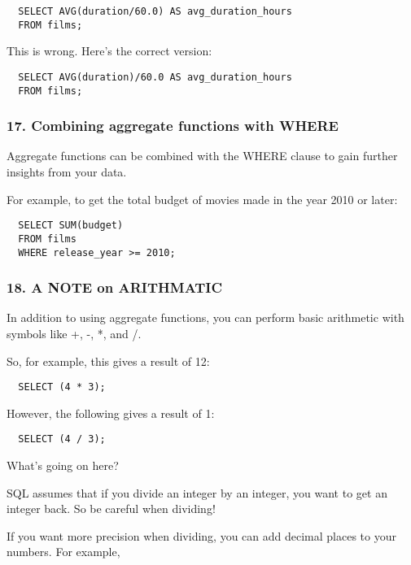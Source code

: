 \documentclass[
]{article}
\begin{document}
\begin{verbatim}
  SELECT AVG(duration/60.0) AS avg_duration_hours
  FROM films;
\end{verbatim}

This is wrong. Here's the correct version:

\begin{verbatim}
  SELECT AVG(duration)/60.0 AS avg_duration_hours
  FROM films;
\end{verbatim}

\hypertarget{combining-aggregate-functions-with-where}{%
\subsubsection{17. Combining aggregate functions with
WHERE}\label{combining-aggregate-functions-with-where}}

Aggregate functions can be combined with the WHERE clause to gain
further insights from your data.

For example, to get the total budget of movies made in the year 2010 or
later:

\begin{verbatim}
  SELECT SUM(budget)
  FROM films
  WHERE release_year >= 2010;
\end{verbatim}

\hypertarget{a-note-on-arithmatic}{%
\subsubsection{18. A NOTE on ARITHMATIC}\label{a-note-on-arithmatic}}

In addition to using aggregate functions, you can perform basic
arithmetic with symbols like +, -, *, and /.

So, for example, this gives a result of 12:

\begin{verbatim}
  SELECT (4 * 3);
\end{verbatim}

However, the following gives a result of 1:

\begin{verbatim}
  SELECT (4 / 3);
\end{verbatim}

What's going on here?

SQL assumes that if you divide an integer by an integer, you want to get
an integer back. So be careful when dividing!

If you want more precision when dividing, you can add decimal places to
your numbers. For example,
\end{document}
